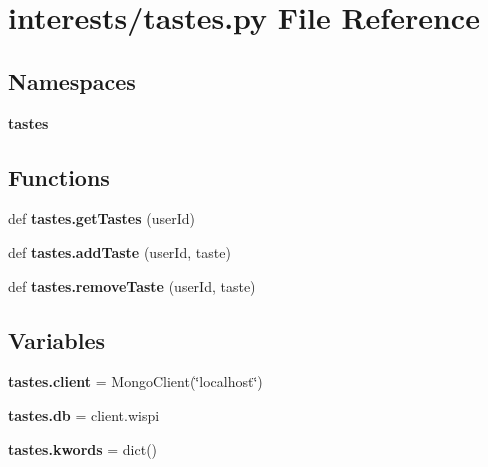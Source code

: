 \section{interests/tastes.py File Reference}
\label{tastes_8py}
\subsection*{Namespaces}
\begin{DoxyCompactItemize}
\item 
 {\bf tastes}
\end{DoxyCompactItemize}
\subsection*{Functions}
\begin{DoxyCompactItemize}
\item 
def {\bf tastes.\+get\+Tastes} (user\+Id)
\item 
def {\bf tastes.\+add\+Taste} (user\+Id, taste)
\item 
def {\bf tastes.\+remove\+Taste} (user\+Id, taste)
\end{DoxyCompactItemize}
\subsection*{Variables}
\begin{DoxyCompactItemize}
\item 
{\bf tastes.\+client} = Mongo\+Client(\char`\"{}localhost\char`\"{})
\item 
{\bf tastes.\+db} = client.\+wispi
\item 
{\bf tastes.\+kwords} = dict()
\end{DoxyCompactItemize}
